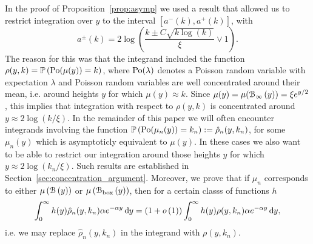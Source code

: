 In the proof of Proposition~\ref{prop:asymp} we used a result that allowed us to restrict integration over $y$ to the interval $[a^-(k), a^+(k)]$, with
\[
	a^\pm(k) = 2\log\left(\frac{k \pm C \sqrt{k \log(k)}}{\xi} \vee 1\right).
\]
The reason for this was that the integrand included the function $\rho(y,k) = \mathbb{P}\left({\mathrm{Po}}(\mu(y)) = k\right)$, where ${\mathrm{Po}}(\lambda)$ denotes a Poisson random variable with expectation $\lambda$ and Poisson random variables are well concentrated around their mean, i.e. around heights $y$ for which $\mu(y) \approx k$. Since $\mu(y) = \mu({\mathcal B}_{\infty}\left(y\right)) = \xi e^{y/2}$, this implies that integration with respect to $\rho(y,k)$ is concentrated around $y \approx 2\log(k/\xi)$. In the remainder of this paper we will often encounter integrands involving the function $\mathbb{P}\left({\mathrm{Po}}(\mu_n(y)) = k_n\right) := \hat{\rho}_n(y,k_n)$, for some $\mu_n(y)$ which is asymptoticly equivalent to $\mu(y)$. In these cases we also want to be able to restrict our integration around those heights $y$ for which $y \approx 2\log(k_n/\xi)$. Such results are established in Section~\ref{sec:concentration_argument}. Moreover, we prove that if $\mu_n$ corresponds to either $\mu\left({\mathcal B}\left(y\right)\right)$ or $\mu\left({\mathcal B}_{\text{box}}\left(y\right)\right)$, then for a certain classs of functions $h$
\[
	\int_0^\infty h(y) \hat{\rho}_n(y,k_n) \alpha e^{-\alpha y} \operatorname{\mathrm{d}\hspace{-2pt}} y 
	= (1+o\left(1\right)) \int_0^\infty h(y) \rho(y,k_n) \alpha e^{-\alpha y} \operatorname{\mathrm{d}\hspace{-2pt}} y,
\]
i.e. we may replace $\hat{\rho}_n(y,k_n)$ in the integrand with $\rho(y,k_n)$.

